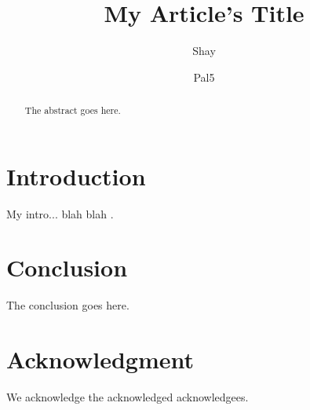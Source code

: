 \documentclass[conference]{IEEEtran}
\title{My Article's Title}
\author{Shay \\ \IEEEauthorblockN{some author afiliation}
\and
Pal5 \\ \IEEEauthorblockN{another affiliation}
}
\begin{document}
\maketitle


\begin{abstract}
The abstract goes here.
\end{abstract}
\IEEEpeerreviewmaketitle

\section{Introduction}
My intro... blah blah \cite{jj2}.

\section{Conclusion}
The conclusion goes here.

\section*{Acknowledgment}
We acknowledge the acknowledged acknowledgees.



\end{document}
